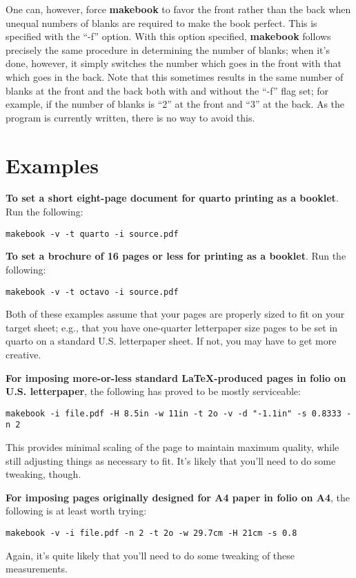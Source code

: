 \documentclass[12pt,twoside,final]{extarticle}
\begin{document}
One can, however, force \textbf{makebook} to favor the front rather than the back when unequal numbers of blanks are required  to  make the book perfect. This is specified with the ``-f'' option. With this option specified, \textbf{makebook} follows precisely the same procedure in determining the number of blanks; when it's done, however, it  simply switches the number which goes in the front with that which goes in the back. Note that this sometimes results in the same number of blanks at the front and the back both with and without the  ``-f'' flag set; for example, if the number of blanks is ``2'' at the front and ``3'' at the back. As the program is currently written, there is no way to avoid this.
\section{Examples}
\textbf{To set a short eight-page document for quarto printing as a booklet}. Run the following:

{\scriptsize
\begin{verbatim}
makebook -v -t quarto -i source.pdf
\end{verbatim}
}
%
\textbf{To set a brochure of 16 pages or less for printing as a booklet}. Run the following:

{\scriptsize
\begin{verbatim}
makebook -v -t octavo -i source.pdf
\end{verbatim}
}
%
Both of these examples assume that your pages are properly sized to fit on your target sheet; e.g., that you have one-quarter letterpaper size pages to be set in quarto on a standard U.S. letterpaper sheet. If not, you may have to get more creative.

\textbf{For imposing more-or-less standard LaTeX-produced pages in folio on U.S. letterpaper}, the following has proved to be mostly serviceable:

{\scriptsize
\begin{verbatim}
makebook -i file.pdf -H 8.5in -w 11in -t 2o -v -d "-1.1in" -s 0.8333 -n 2
\end{verbatim}
}
%
This provides minimal scaling of the page to maintain maximum quality, while still adjusting things as necessary to fit.  It's likely that you'll need to do some tweaking, though.

\textbf{For imposing pages originally designed for A4 paper in folio on A4}, the following is at least worth trying:

{\scriptsize
\begin{verbatim}
makebook -v -i file.pdf -n 2 -t 2o -w 29.7cm -H 21cm -s 0.8
\end{verbatim}
}
%
Again, it's quite likely that you'll need to do some tweaking of these measurements.
\end{document}
